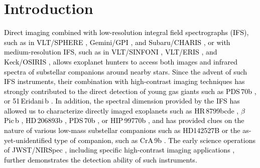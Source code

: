 \documentclass{aa}
\newcommand{\newchange}[1]{\textcolor{black}{#1}}
\begin{document}
\maketitle
%

\section{Introduction}

\newchange{Direct imaging combined with low-resolution integral field spectrographs (IFS), such as in VLT/SPHERE \citep{2019Beuzit}, Gemini/GPI \citep{2014MacintoshGPI}, and Subaru/CHARIS \citep{Groff2015}, or with medium-resolution IFS, such as in VLT/SINFONI \citep{2004SINFONI}, VLT/ERIS \citep{2023Davies}, and Keck/OSIRIS \citep{2000OSIRIS}, allows exoplanet hunters to access both images and infrared spectra of  substellar companions around nearby stars.
Since the advent of such IFS instruments, their combination with high-contrast imaging techniques has strongly contributed to the direct detection of young gas giants such as PDS\,70b \citep{2018KepplerPDS70}, or 51\,Eridani\,b \citep{2015MacintoshEridani}.
In addition, the spectral dimension provided by the IFS has allowed us to characterize directly imaged exoplanets such as HR\,8799bcde \citep[e.g.][]{2013Konopacky,Bonnefoy2016}, $\beta$\,Pic\,b \citep[e.g.][]{Bonnefoy2014,2017ChilcoteBetapic}, HD\,206893b \citep[e.g.][]{2017DelormeHD206893b}, PDS\,70b \citep[e.g.][]{2018MullerPDS70,2019ChristiaensPDS70}, or HIP\,99770b \citep[][]{2023Currie}, and has provided clues on the nature of various  low-mass substellar companions such as HD142527B \citep[e.g.][]{2018A&ChristiaensHD142527} or the as-yet-unidentified type of companion, such as CrA\,9b \citep[][]{2021ChristiaensCrA-9b}.
\newchange{The early science operations of JWST/NIRSpec \citep{2022BokerJWST}, including specific high-contrast imaging applications \citep{2023RuffioJWST}, further demonstrates the detection ability of such instruments.}}
\end{document}
